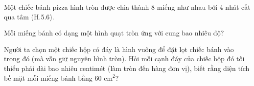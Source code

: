 \begin{practice}
\begin{questions}[resume=SBT]
        \answerline
        \answerline
        \answerline

        \item Một chiếc bánh pizza hình tròn được chia thành 8 miếng như nhau bởi 4 nhát cắt qua tâm (H.5.6).
        \begin{questions}
            \item Mỗi miếng bánh có dạng một hình quạt tròn ứng với cung bao nhiêu độ?

            \answerline

            \item Người ta chọn một chiếc hộp có đáy là hình vuông để đặt lọt chiếc bánh vào trong đó (mà vẫn giữ nguyên hình tròn). Hỏi mỗi cạnh đáy của chiếc hộp đó tối thiểu phải dài bao nhiêu centimét (làm tròn đến hàng đơn vị), biết rằng diện tích bề mặt mỗi miếng bánh bằng 60 cm$^2$?

            \answerline
            \answerline
            \answerline
        \end{questions}

    \end{questions}
\end{practice}
